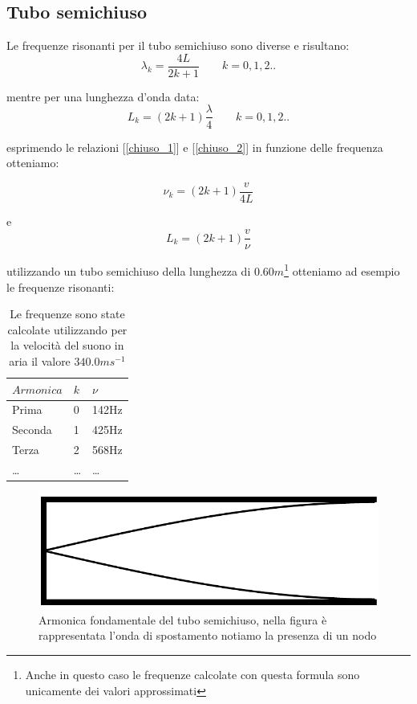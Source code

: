\documentclass[a4paper,10pt,oneside]{article}
\begin{document}
\subsection*{Tubo semichiuso}
Le frequenze risonanti per il tubo semichiuso sono diverse e risultano:
\begin{equation}\label{chiuso_1}
 \lambda_k=\frac{4L}{2k+1}\qquad k=0,1,2..
\end{equation}

mentre per una lunghezza d'onda data:
\begin{equation}\label{chiuso_2}
 L_k=(2k+1)\frac{\lambda}{4}\qquad k=0,1,2..
\end{equation}

esprimendo le relazioni [\ref{chiuso_1}] e [\ref{chiuso_2}] in funzione delle frequenza otteniamo:

\begin{equation}
 \nu_k=(2k+1)\frac{v}{4L}
\end{equation}

e
\begin{equation}
 L_k=(2k+1)\frac{v}{\nu}
\end{equation}


utilizzando un tubo semichiuso della lunghezza di $0.60m$\footnote{Anche in questo caso le frequenze calcolate con questa formula sono unicamente dei valori approssimati} otteniamo ad esempio le frequenze risonanti:
\begin{table}[H]
\begin{center}
\begin{tabular}{lll}\toprule
$Armonica$ &$k$&$\nu$\\ \midrule
Prima & 0 & 142Hz\\
Seconda & 1&425Hz\\
Terza & 2&568Hz\\
\ldots &\ldots&\ldots \\ \bottomrule
\end{tabular}\caption{Le frequenze sono state calcolate utilizzando per la velocità del suono in aria il valore $340.0ms^{-1}$}\label{tab:chiuso}
\end{center}
\end{table}

\begin{figure}[H]
 \centering
 \includegraphics[width=\textwidth]{../Immagini/chiuso_1.png}
 \caption{Armonica fondamentale del tubo semichiuso, nella figura è rappresentata l'onda di spostamento notiamo la presenza di un nodo}
 \label{fig:chiuso_base}
\end{figure}
\end{document}
